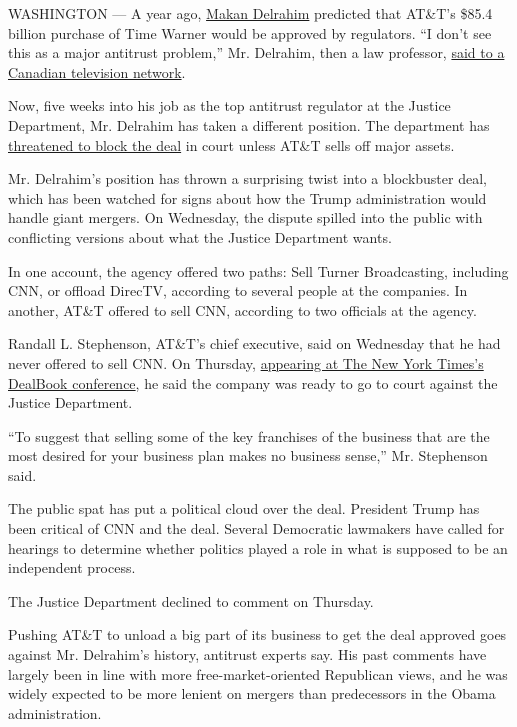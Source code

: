 WASHINGTON --- A year ago, \href{https://www.justice.gov/atr}{Makan
Delrahim} predicted that AT\&T's \$85.4 billion purchase of Time Warner
would be approved by regulators. ``I don't see this as a major antitrust
problem,'' Mr. Delrahim, then a law professor,
\href{http://www.bnn.ca/video/no-big-worries-in-at-t-deal-for-time-warner~978794}{said
to a Canadian television network}.

Now, five weeks into his job as the top antitrust regulator at the
Justice Department, Mr. Delrahim has taken a different position. The
department has
\href{https://www.nytimes.com/2017/11/08/business/dealbook/att-time-warner.html}{threatened
to block the deal} in court unless AT\&T sells off major assets.

Mr. Delrahim's position has thrown a surprising twist into a blockbuster
deal, which has been watched for signs about how the Trump
administration would handle giant mergers. On Wednesday, the dispute
spilled into the public with conflicting versions about what the Justice
Department wants.

In one account, the agency offered two paths: Sell Turner Broadcasting,
including CNN, or offload DirecTV, according to several people at the
companies. In another, AT\&T offered to sell CNN, according to two
officials at the agency.

Randall L. Stephenson, AT\&T's chief executive, said on Wednesday that
he had never offered to sell CNN. On Thursday,
\href{https://www.nytimes.com/2017/11/09/business/dealbook/att-time-warner-cnn.html}{appearing
at The New York Times's DealBook conference}, he said the company was
ready to go to court against the Justice Department.

``To suggest that selling some of the key franchises of the business
that are the most desired for your business plan makes no business
sense,'' Mr. Stephenson said.

The public spat has put a political cloud over the deal. President Trump
has been critical of CNN and the deal. Several Democratic lawmakers have
called for hearings to determine whether politics played a role in what
is supposed to be an independent process.

The Justice Department declined to comment on Thursday.

Pushing AT\&T to unload a big part of its business to get the deal
approved goes against Mr. Delrahim's history, antitrust experts say. His
past comments have largely been in line with more free-market-oriented
Republican views, and he was widely expected to be more lenient on
mergers than predecessors in the Obama administration.

